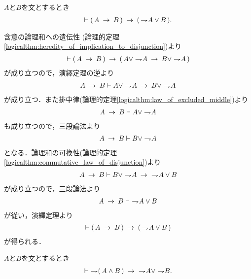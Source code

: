 	\begin{screen}
		\begin{logicalthm}[含意は否定と論理和で表せる]
		\label{logicalthm:implication_rewritable_by_disjunction_of_negation}
			$A$と$B$を文とするとき
			\begin{align}
				\vdash (\, A \rarrow B\, ) \rarrow (\, \negation A \vee B\, ).
			\end{align}
		\end{logicalthm}
	\end{screen}
	
	\begin{prf}
		含意の論理和への遺伝性
		(論理的定理\ref{logicalthm:heredity_of_implication_to_disjunction})より
		\begin{align}
			\vdash (\, A \rarrow B\, ) 
			\rarrow (\, A \vee \negation A \rarrow B \vee \negation A\, )
		\end{align}
		が成り立つので，演繹定理の逆より
		\begin{align}
			A \rarrow B \vdash A \vee \negation A \rarrow B \vee \negation A
		\end{align}
		が成り立つ．また排中律(論理的定理\ref{logicalthm:law_of_excluded_middle})より
		\begin{align}
			A \rarrow B \vdash A \vee \negation A
		\end{align}
		も成り立つので，三段論法より
		\begin{align}
			A \rarrow B \vdash B \vee \negation A
		\end{align}
		となる．論理和の可換性(論理的定理\ref{logicalthm:commutative_law_of_disjunction})より
		\begin{align}
			A \rarrow B \vdash B \vee \negation A \rarrow\ \negation A \vee B
		\end{align}
		が成り立つので，三段論法より
		\begin{align}
			A \rarrow B \vdash\ \negation A \vee B
		\end{align}
		が従い，演繹定理より
		\begin{align}
			\vdash (\, A \rarrow B\, ) \rarrow (\, \negation A \vee B\, )
		\end{align}
		が得られる．
		\QED
	\end{prf}
	
	\begin{screen}
		\begin{logicalthm}
		\label{logicalthm:strong_De_Morgan_law_2}
			$A$と$B$を文とするとき
			\begin{align}
				\vdash\ \negation (\, A \wedge B\, )
				\rarrow\ \negation A \vee \negation B.
			\end{align}
		\end{logicalthm}
	\end{screen}
	
